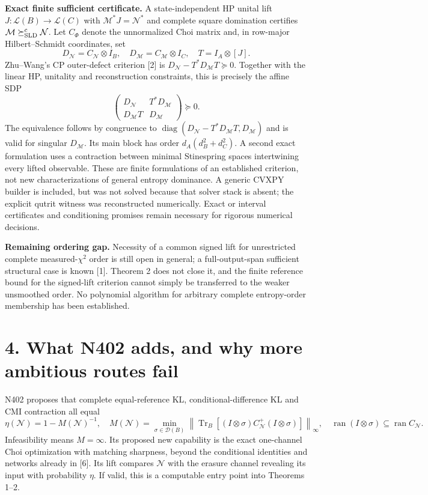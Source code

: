 \documentclass[10pt,a4paper]{article}
\newcommand{\Tr}{\operatorname{Tr}}
\newcommand{\ran}{\operatorname{ran}}
\newcommand{\D}{\mathcal D}
\newcommand{\N}{\mathcal N}
\newcommand{\M}{\mathcal M}
\begin{document}
\textbf{Exact finite sufficient certificate.} A state-independent HP unital lift $J:\mathcal L(B)\to\mathcal L(C)$ with $\M^*J=\N^*$ and complete square domination certifies $\M\succeq^c_{\rm SLD}\N$. Let $C_\Phi$ denote the unnormalized Choi matrix and, in row-major Hilbert--Schmidt coordinates, set
\[
 D_\N=C_\N\otimes I_B,\quad D_\M=C_\M\otimes I_C,\quad T=I_A\otimes[J].
\]
Zhu--Wang's CP outer-defect criterion [2] is $D_\N-T^*D_\M T\succeq0$. Together with the linear HP, unitality and reconstruction constraints, this is precisely the affine SDP
\[
 \boxed{\begin{pmatrix}D_\N&T^*D_\M\\D_\M T&D_\M\end{pmatrix}\succeq0.} \tag{12}
\]
The equivalence follows by congruence to
$\operatorname{diag}(D_\N-T^*D_\M T,D_\M)$ and is valid for singular $D_\M$.
Its main block has order $d_A(d_B^2+d_C^2)$. A second exact formulation uses a contraction between minimal Stinespring spaces intertwining every lifted observable. These are finite formulations of an established criterion, not new characterizations of general entropy dominance. A generic CVXPY builder is included, but was not solved because that solver stack is absent; the explicit qutrit witness was reconstructed numerically. Exact or interval certificates and conditioning promises remain necessary for rigorous numerical decisions.

\textbf{Remaining ordering gap.} Necessity of a common signed lift for unrestricted complete measured-$\chi^2$ order is still open in general; a full-output-span sufficient structural case is known [1]. Theorem 2 does not close it, and the finite reference bound for the signed-lift criterion cannot simply be transferred to the weaker unsmoothed order. No polynomial algorithm for arbitrary complete entropy-order membership has been established.

\section*{4. What N402 adds, and why more ambitious routes fail}

N402 proposes that complete equal-reference KL, conditional-difference KL and CMI contraction all equal
\[
 \eta(\N)=1-M(\N)^{-1},\quad
 M(\N)=\min_{\sigma\in\D(B)}
 \left\|\Tr_B[(I\otimes\sigma)C_\N^+(I\otimes\sigma)]\right\|_\infty,
 \quad\ran(I\otimes\sigma)\subseteq\ran C_\N. \tag{13}
\]
Infeasibility means $M=\infty$. Its proposed new capability is the exact one-channel Choi optimization with matching sharpness, beyond the conditional identities and networks already in [6]. Its lift compares $\N$ with the erasure channel revealing its input with probability $\eta$. If valid, this is a computable entry point into Theorems 1--2.
\end{document}
